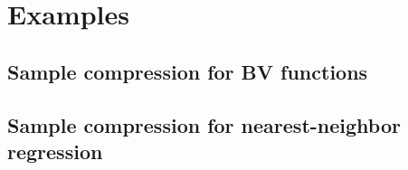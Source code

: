 
\chapter{Examples}

\blindtext
    
    



\section{Sample compression for BV functions}

\blindmathpaper

    



\section{Sample compression for nearest-neighbor regression}

\blindmathpaper

    



